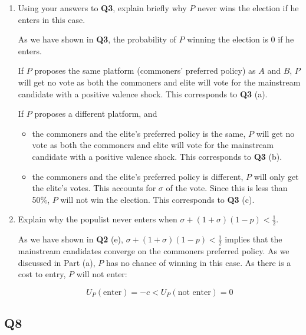 \documentclass[
  letterpaper,
  abstract=true]{scrartcl}
\begin{document}
\begin{enumerate}
\def\labelenumi{(\alph{enumi})}
\item
  Using your answers to \textbf{Q3}, explain briefly why \(P\) never
  wins the election if he enters in this case.

  \color{blue}

  As we have shown in \textbf{Q3}, the probability of \(P\) winning the
  election is \(0\) if he enters.

  If \(P\) proposes the same platform (commoners' preferred policy) as
  \(A\) and \(B\), \(P\) will get no vote as both the commoners and
  elite will vote for the mainstream candidate with a positive valence
  shock. This corresponds to \textbf{Q3} (a).

  If \(P\) proposes a different platform, and

  \begin{itemize}
  \item
    the commoners and the elite's preferred policy is the same, \(P\)
    will get no vote as both the commoners and elite will vote for the
    mainstream candidate with a positive valence shock. This corresponds
    to \textbf{Q3} (b).
  \item
    the commoners and the elite's preferred policy is different, \(P\)
    will only get the elite's votes. This accounts for \(\sigma\) of the
    vote. Since this is less than 50\%, \(P\) will not win the election.
    This corresponds to \textbf{Q3} (c).
  \end{itemize}

  \color{black}
\item
  Explain why the populist never enters when
  \(\sigma+(1+\sigma)(1−p)<\frac{1}{2}\).

  \color{blue}

  As we have shown in \textbf{Q2} (e),
  \(\sigma+(1+\sigma)(1−p)<\frac{1}{2}\) implies that the mainstream
  candidates converge on the commoners preferred policy. As we discussed
  in Part (a), \(P\) has no chance of winning in this case. As there is
  a cost to entry, \(P\) will not enter:

  \[
  U_P(\text{enter})=-c<U_P(\text{not enter})=0
  \]

  \color{black}
\end{enumerate}

\hypertarget{q8}{%
\subsection{Q8}\label{q8}}
\end{document}
